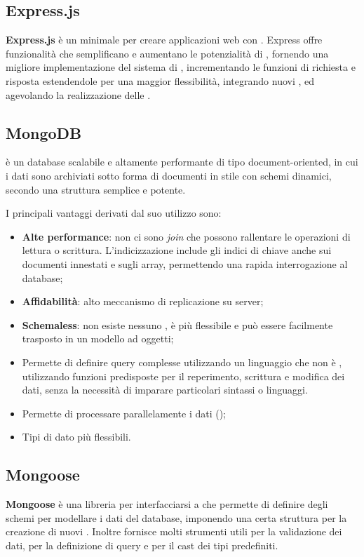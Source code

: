 \subsection{Express.js}
\textbf{Express.js} è un  minimale per creare applicazioni web con . 
Express offre funzionalità che semplificano e aumentano le potenzialità di , fornendo una migliore implementazione del sistema di , incrementando le funzioni di richiesta e risposta estendendole per una maggior flessibilità, integrando nuovi , ed agevolando la realizzazione delle . 

\subsection{MongoDB}
 è un database   scalabile e altamente performante di tipo document-oriented, in cui i dati sono archiviati sotto forma di documenti in stile  con schemi dinamici, secondo una struttura semplice e potente.

I principali vantaggi derivati dal suo utilizzo sono:
\begin{itemize}
	\item \textbf{Alte performance}: non ci sono \emph{join} che possono rallentare le operazioni di lettura o scrittura. L'indicizzazione include gli indici di chiave anche sui documenti innestati e sugli array, permettendo una rapida interrogazione al database;
	\item \textbf{Affidabilità}: alto meccanismo di replicazione su server;
	\item \textbf{Schemaless}: non esiste nessuno , è più flessibile e può essere facilmente trasposto in un modello ad oggetti;
	\item Permette di definire query complesse utilizzando un linguaggio che non è , utilizzando funzioni predisposte per il reperimento, scrittura e modifica dei dati, senza la necessità di imparare particolari sintassi o linguaggi.
	\item Permette di processare parallelamente i dati ();
	\item Tipi di dato più flessibili.
\end{itemize}

\subsection{Mongoose}
\textbf{Mongoose} è una libreria per interfacciarsi a  che permette di definire degli schemi per modellare i dati del database, imponendo una certa struttura per la creazione di nuovi . Inoltre fornisce molti strumenti utili per la validazione dei dati, per la definizione di query e per il cast dei tipi predefiniti.

